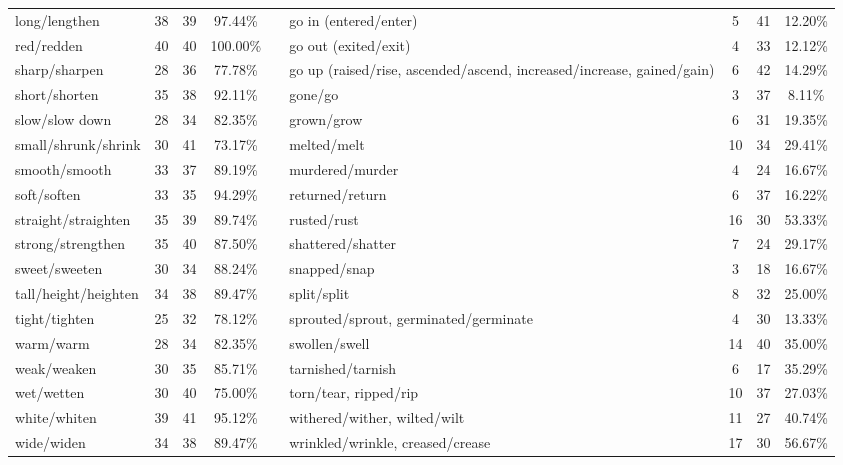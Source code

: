 \begin{tabular}{p{3cm}ccccp{3cm}ccc}
long/lengthen & 38 & 39 & 97.44\% & & go in (entered/enter) & 5 & 41 & 12.20\% \\
red/redden & 40 & 40 & 100.00\% & & go out (exited/exit) & 4 & 33 & 12.12\% \\
sharp/sharpen & 28 & 36 & 77.78\% & & go up (raised/rise, ascended/ascend, increased/increase, gained/gain) & 6 & 42 & 14.29\% \\
short/shorten & 35 & 38 & 92.11\% & & gone/go & 3 & 37 & 8.11\% \\
slow/slow down & 28 & 34 & 82.35\% & & grown/grow & 6 & 31 & 19.35\% \\
small/shrunk/shrink & 30 & 41 & 73.17\% & & melted/melt & 10 & 34 & 29.41\% \\
smooth/smooth & 33 & 37 & 89.19\% & & murdered/murder & 4 & 24 & 16.67\% \\
soft/soften & 33 & 35 & 94.29\% & & returned/return & 6 & 37 & 16.22\% \\
straight/straighten & 35 & 39 & 89.74\% & & rusted/rust & 16 & 30 & 53.33\% \\
strong/strengthen & 35 & 40 & 87.50\% & & shattered/shatter & 7 & 24 & 29.17\% \\
sweet/sweeten & 30 & 34 & 88.24\% & & snapped/snap & 3 & 18 & 16.67\% \\
tall/height/heighten & 34 & 38 & 89.47\% & & split/split & 8 & 32 & 25.00\% \\
tight/tighten & 25 & 32 & 78.12\% & & sprouted/sprout, germinated/germinate & 4 & 30 & 13.33\% \\
warm/warm & 28 & 34 & 82.35\% & & swollen/swell & 14 & 40 & 35.00\% \\
weak/weaken & 30 & 35 & 85.71\% & & tarnished/tarnish & 6 & 17 & 35.29\% \\
wet/wetten & 30 & 40 & 75.00\% & & torn/tear, ripped/rip & 10 & 37 & 27.03\% \\
white/whiten & 39 & 41 & 95.12\% & & withered/wither, wilted/wilt & 11 & 27 & 40.74\% \\
wide/widen & 34 & 38 & 89.47\% & & wrinkled/wrinkle, creased/crease & 17 & 30 & 56.67\%
\end{tabular}